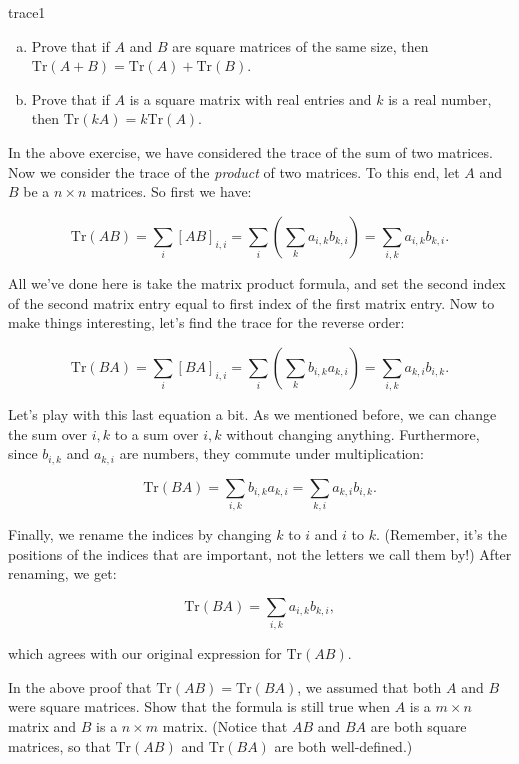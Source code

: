 \begin{exercise}{trace1}
\begin{enumerate}[(a)]
\item
Prove that if $A$ and $B$ are square matrices of the same size, then $\text{Tr} \left( A + B \right) = \text{Tr} \left( A \right) + \text{Tr} \left( B \right)$.
\item
Prove that if $A$ is a square matrix with real entries and $k$ is a real number, then $\text{Tr} \left(k A  \right) = k\text{Tr} \left( A \right)$.
\end{enumerate}
\end{exercise}


In the above exercise, we have considered the trace of the sum of two matrices. Now we consider the trace of the \emph{product} of two matrices.  To this end, let ${A}$ and  ${B}$ be a $n \times n$ matrices.  So first we have:

\[ \text{Tr} \left({A} {B}\right) = \sum_{i} [AB]_{i,i} = \sum_{i}\left( \sum_k a_{i,k}b_{k,i}\right) = \sum_{i,k}a_{i,k}b_{k,i}. \]

All we've done here is take the matrix product formula, and set the second index of the second  matrix entry equal to first index of the first matrix entry.  Now to make things interesting, let's find the trace for the reverse order:

\[ \text{Tr} \left({B} {A}\right) = \sum_{i} [BA]_{i,i} = \sum_{i} \left( \sum_{k} b_{i,k}a_{k,i} \right) = \sum_{i,k}a_{k,i}b_{i,k}. \]

Let's play with this last equation a bit. As we mentioned before, we can change the sum over $i,k$ to a sum over $i,k$ without changing anything. Furthermore, since $b_{i,k}$ and $a_{k,i}$ are numbers, they commute under multiplication:

\[ \text{Tr} \left({B} {A}\right) =\sum_{i,k} b_{i,k}a_{k,i} =  \sum_{k,i} a_{k,i}b_{i,k}. \]

Finally, we rename the indices by changing $k$ to $i$ and $i$ to $k$.  (Remember, it's the positions of the indices that are important, not the letters we call them by!)  After renaming, we get:

\[ \text{Tr} \left({B} {A}\right) =\sum_{i,k} a_{i,k}b_{k,i}, \]

which agrees with our original expression for  $\text{Tr} ({A}{B})$.

\begin{exercise}{}
In the above proof that $\text{Tr} ({AB}) = \text{Tr}({BA})$, we assumed that both $A$ and $B$ were square matrices. Show that the formula is still true when $A$ is a $m \times n$ matrix and $B$ is a $n \times m$ matrix.  (Notice that $AB$ and $BA$ are both square matrices, so that $\text{Tr} \left({A} {B}\right)$ and $\text{Tr} \left({B} {A}\right)$ are both well-defined.)
\end{exercise}

